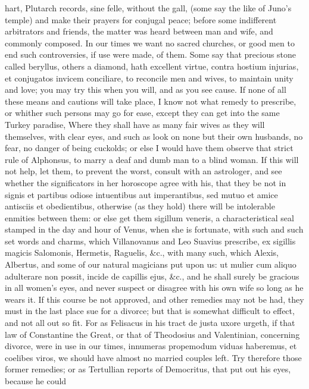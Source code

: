 {hart, Plutarch records, sine felle, without the gall, (some say the
like of Juno's temple) and make their prayers for conjugal peace;
before some  indifferent arbitrators and friends, the matter was
heard between man and wife, and commonly composed. In our times we want
no sacred churches, or good men to end such controversies, if use were
made, of them. Some say that precious stone called beryllus,
others a diamond, hath excellent virtue, contra hostium injurias, et
conjugatos invicem conciliare, to reconcile men and wives, to maintain
unity and love; you may try this when you will, and as you see cause.
If none of all these means and cautions will take place, I know not
what remedy to prescribe, or whither such persons may go for ease,
except they can get into the same Turkey paradise, Where they
shall have as many fair wives as they will themselves, with clear eyes,
and such as look on none but their own husbands, no fear, no danger of
being cuckolds; or else I would have them observe that strict rule of
Alphonsus, to marry a deaf and dumb man to a blind woman. If this
will not help, let them, to prevent the worst, consult with an
astrologer, and see whether the significators in her horoscope
agree with his, that they be not in signis et partibus odiose
intuentibus aut imperantibus, sed mutuo et amice antisciis et
obedientibus, otherwise (as they hold) there will be intolerable
enmities between them: or else get them sigillum veneris, a
characteristical seal stamped in the day and hour of Venus, when she is
fortunate, with such and such set words and charms, which Villanovanus
and Leo Suavius prescribe, ex sigillis magicis Salomonis, Hermetis,
Raguelis, \&c., with many such, which Alexis, Albertus, and some of our
natural magicians put upon us: ut mulier cum aliquo adulterare non
possit, incide de capillis ejus, \&c., and he shall surely be gracious
in all women's eyes, and never suspect or disagree with his own wife so
long as he wears it. If this course be not approved, and other remedies
may not be had, they must in the last place sue for a divorce; but that
is somewhat difficult to effect, and not all out so fit. For as
Felisacus in his tract de justa uxore urgeth, if that law of
Constantine the Great, or that of Theodosius and Valentinian,
concerning divorce, were in use in our times, innumeras propemodum
viduas haberemus, et coelibes viros, we should have almost no married
couples left. Try therefore those former remedies; or as Tertullian
reports of Democritus, that put out his eyes, because he could
}
